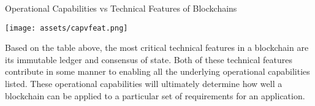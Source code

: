 \documentclass[12pt]{report}
\begin{document}
\begin{comment}
\begin{table}[!h]
\centering
\caption{Operational Capabilities vs Technical Features of Blockchains}
\label{table:capvfeat}
\resizebox{\textwidth}{!}{%
\begin{tabular}{|l|l|l|l|l|l|l|l|l|}
 \hline
  \textbf{Capabilties/Features} & \textbf{Immutable Ledger} & \textbf{Consensus} & \textbf{Smart Contracts} & \textbf{Multi-Sig} & \textbf{Cryptography} & \textbf{Asset Digitization} & \textbf{P2P} & \textbf{Capability Total} \\ 
 \hline
 \textbf{Transfer of Value} & 1 & 1 & 1 & 1 & 0 & 1 & 0 & 5 \\
 \hline
 \textbf{Security} & 1 & 1 & 1 & 1 & 1 & 0 & 0 & 5 \\
 \hline
 \textbf{Auditability} & 1 & 1 & 0 & 0 & 1 & 1 & 0 & 4 \\
 \hline
 \textbf{Decentralization of Trust} & 1 & 1 & 1 & 0 & 0 & 0 & 1 & 4 \\
 \hline
 \textbf{Feature Total} & 4 & 4 & 3 & 2 & 2 & 2 & 1 & . \\
 \hline
\end{tabular}%
}
\end{table}
\end{comment}

\begin{table}[h]
\begin{center}
\caption{Operational Capabilities vs Technical Features of Blockchains}
\texttt{[image: assets/capvfeat.png]}
\label{table:capvfeat}
\end{center}
\end{table}


Based on the table above, the most critical  technical features in a blockchain are its immutable ledger and consensus of state. Both of these technical features contribute in some manner to enabling all the underlying operational capabilities listed. These operational capabilities will ultimately determine how well a blockchain can be applied to a particular set of requirements for an application. 

\end{document}
